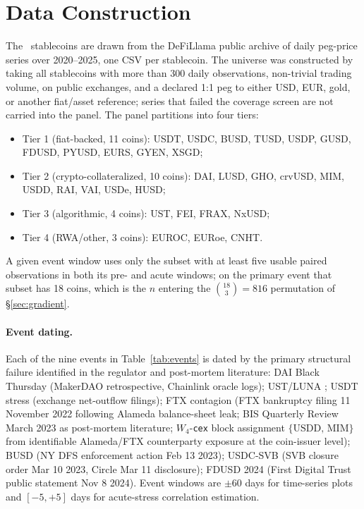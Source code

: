 \section{Data Construction}\label{app:data}
The \NPANEL\ stablecoins are drawn from the DeFiLlama public archive of daily peg-price series over 2020--2025, one CSV per stablecoin. The universe was constructed by taking all stablecoins with more than 300 daily observations, non-trivial trading volume, on public exchanges, and a declared 1:1 peg to either USD, EUR, gold, or another fiat/asset reference; series that failed the coverage screen are not carried into the panel. The panel partitions into four tiers:
\begin{itemize}[leftmargin=1.8em]
\item Tier 1 (fiat-backed, 11 coins): USDT, USDC, BUSD, TUSD, USDP, GUSD, FDUSD, PYUSD, EURS, GYEN, XSGD;
\item Tier 2 (crypto-collateralized, 10 coins): DAI, LUSD, GHO, crvUSD, MIM, USDD, RAI, VAI, USDe, HUSD;
\item Tier 3 (algorithmic, 4 coins): UST, FEI, FRAX, NxUSD;
\item Tier 4 (RWA/other, 3 coins): EUROC, EURoe, CNHT.
\end{itemize}
A given event window uses only the subset with at least five usable paired observations in both its pre- and acute windows; on the primary event that subset has 18 coins, which is the $n$ entering the $\binom{18}{3}=816$ permutation of \S\ref{sec:gradient}.

\paragraph{Event dating.} Each of the nine events in Table~\ref{tab:events} is dated by the primary structural failure identified in the regulator and post-mortem literature: DAI Black Thursday (MakerDAO retrospective, Chainlink oracle logs); UST/LUNA \citep{LiuLiSprenger2023}; USDT stress (exchange net-outflow filings); FTX contagion (FTX bankruptcy filing 11 November 2022 following Alameda balance-sheet leak; BIS Quarterly Review March 2023 as post-mortem literature; $W_4$-\texttt{cex} block assignment $\{\text{USDD, MIM}\}$ from identifiable Alameda/FTX counterparty exposure at the coin-issuer level); BUSD (NY DFS enforcement action Feb 13 2023); USDC-SVB (SVB closure order Mar 10 2023, Circle Mar 11 disclosure); FDUSD 2024 (First Digital Trust public statement Nov 8 2024). Event windows are $\pm 60$ days for time-series plots and $[-5, +5]$ days for acute-stress correlation estimation.

